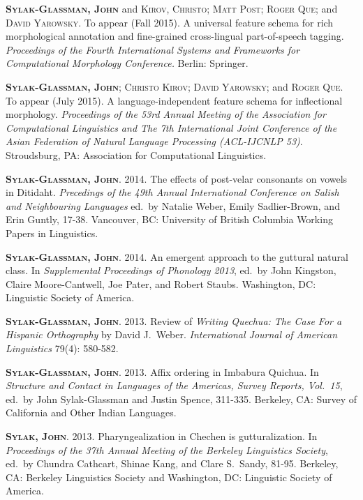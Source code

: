\documentclass[11pt]{article}
\renewcommand{\bf}[1]{\textbf{#1}}
\newcommand{\ca}[1]{\textsc{#1}}
\renewcommand{\it}[1]{\textit{#1}}
\begin{document}
\begin{reflist}
\ca{\bf{Sylak-Glassman, John}} and \ca{Kirov, Christo}; \ca{Matt Post; Roger Que;} and \ca{David Yarowsky}. To appear (Fall 2015). A universal feature schema for rich morphological annotation and fine-grained cross-lingual part-of-speech tagging. \it{Proceedings of the Fourth International Systems and Frameworks for Computational Morphology Conference.} Berlin: Springer.

\ca{\bf{Sylak-Glassman, John}; Christo Kirov; David Yarowsky}; and \ca{Roger Que}. To appear (July 2015). A language-independent feature schema for inflectional morphology. \it{Proceedings of the 53rd Annual Meeting of the Association for Computational Linguistics and The 7th International Joint Conference of the Asian Federation of Natural Language Processing (ACL-IJCNLP 53)}. Stroudsburg, PA: Association for Computational Linguistics.

\ca{\bf{Sylak-Glassman, John}}. 2014. The effects of post-velar consonants on vowels in Ditidaht. \it{Precedings of the 49th Annual International Conference on Salish and Neighbouring Languages} ed.~by Natalie Weber, Emily Sadlier-Brown, and Erin Guntly, 17-38. Vancouver, BC: University of British Columbia Working Papers in Linguistics.

\ca{\bf{Sylak-Glassman, John}}. 2014. An emergent approach to the guttural natural class. In \it{Supplemental Proceedings of Phonology 2013}, ed.~by John Kingston, Claire Moore-Cantwell, Joe Pater, and Robert Staubs. Washington, DC: Linguistic Society of America.

\ca{\bf{Sylak-Glassman, John}}. 2013. Review of \it{Writing Quechua: The Case For a Hispanic Orthography} by David J.~Weber. \it{International Journal of American Linguistics} 79(4): 580-582. 

\ca{\bf{Sylak-Glassman, John}}. 2013. Affix ordering in Imbabura Quichua. In \it{Structure and Contact in Languages of the Americas, Survey Reports, Vol.~15}, ed.~by John Sylak-Glassman and Justin Spence, 311-335. Berkeley, CA: Survey of California and Other Indian Languages.

\ca{\bf{Sylak, John}}. 2013. Pharyngealization in Chechen is gutturalization. In \it{Proceedings of the 37th Annual Meeting of the Berkeley Linguistics Society}, ed.~by Chundra Cathcart, Shinae Kang, and Clare S.~Sandy, 81-95. Berkeley, CA: Berkeley Linguistics Society and Washington, DC: Linguistic Society of America.


\end{reflist}
\end{document}
